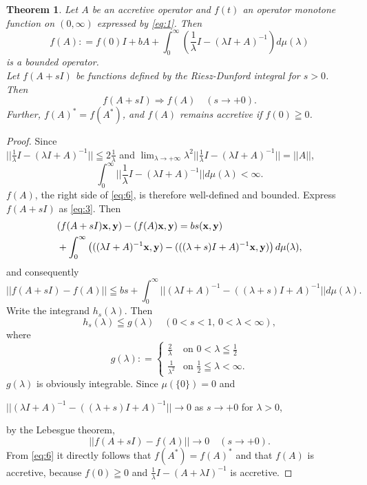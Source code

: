 \documentclass[reqno]{amsart}
\newtheorem{theorem}{Theorem}[section]
\theoremstyle{definition}
\theoremstyle{remark}
\begin{document}
\begin{theorem}\label{Th:3-1}
Let $A$ be an accretive operator and  $f(t)$ an operator monotone function
 on $(0, \infty)$ expressed by \eqref{eq:1}. 
Then   
\begin{equation}
 f(A): = f(0)I + b A + \int_0^{\infty} (\frac{1}{\lambda} I - (\lambda I + A)^{-1})
d\mu(\lambda) \label{eq:6}
\end{equation}
 is a bounded operator. \\
Let $f(A+ sI)$ be functions defined by the Riesz-Dunford integral for $s>0$. Then 
$$f(A+ sI)  \Longrightarrow f(A) \quad (s \to +0).$$
Further, $f(A)^* = f(A^*)$, and $f(A)$ remains accretive if $f(0)\geqq 0$. 
\end{theorem}
\begin{proof}
 Since \\
$||\frac{1}{\lambda} I - (\lambda I  + A)^{-1}|| \leqq  2\frac{1}{\lambda} $ and $\lim_{\lambda \to + \infty} \lambda^2 ||\frac{1}{\lambda} I - (\lambda I  + A)^{-1}|| = || A||$, 
 $$\int_0^{\infty} ||\frac{1}{\lambda} I - (\lambda I  + A)^{-1}|| d\mu(\lambda)
<\infty.$$
$f(A)$, the right side of \eqref{eq:6}, is therefore well-defined and bounded.  
Express $f(A + sI)$ as \eqref{eq:3}. Then 
\begin{align*}
&( f(A + s I) {\bf x}, {\bf y}) -( f(A) {\bf x}, {\bf y}) = 
 b  s ({\bf x}, {\bf y}) \\ 
&+ \int_0^{\infty} \left(( (\lambda  I + A)^{-1} {\bf x}, {\bf y}) - 
( ((\lambda + s) I + A)^{-1} {\bf x}, {\bf y}) \right)
 d\mu(\lambda),
\end{align*}
and consequently  
$$|| f(A + sI) - f(A)|| \leqq b  s +  \int_0^{\infty} ||(\lambda  I + A)^{-1}   - 
((\lambda + s) I + A)^{-1} || d\mu (\lambda).
$$
Write the integrand $h_s (\lambda)$. Then 
$$ h_s(\lambda) \leqq  g(\lambda) \quad  (0<s<1, \, 0<\lambda <\infty),$$
where 
$$ g(\lambda): =
\begin{cases}
\frac{2}{\lambda}  & \text{on} \,\, 0 <\lambda \leqq \frac{1}{2}\\
\frac{1}{\lambda^2}  & \text{on} \,\, \frac{1}{2}\leqq \lambda <\infty.
\end{cases}
$$
$g(\lambda)$ is obviously integrable. 
Since $\mu(\{0\}) =0$ and 
\begin{center}
$||(\lambda  I + A)^{-1}   - 
((\lambda + s) I + A)^{-1}|| \to 0$ as $s\to + 0$ for $\lambda >0$,
\end{center}
by the Lebesgue theorem,  
$$|| f(A + sI) - f(A)|| \to 0 \quad (s\to +0).$$
 From \eqref{eq:6} it directly follows that $f(A^{*})= f(A)^{*}$ and that 
$f(A)$ is accretive, because $f(0)\geqq 0$ and 
$\frac{1}{\lambda}I - (A + \lambda I)^{-1}$ is accretive.
\end{proof}
\end{document}
